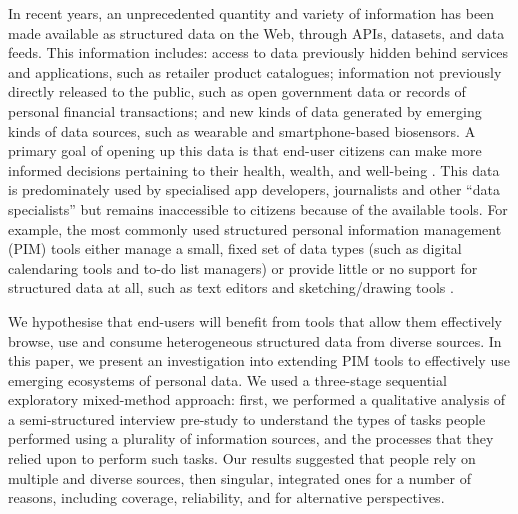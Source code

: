\documentclass{sigchi}
\begin{document}
In recent years, an unprecedented quantity and variety of information has been made available as structured data on the Web, through APIs, datasets, and data feeds.  This information includes: access to data previously hidden behind services and applications, such as retailer product catalogues; information not previously directly released to the public, such as open government data or records of personal financial transactions; and new kinds of data generated by emerging kinds of data sources, such as wearable and smartphone-based biosensors.  A primary goal of opening up this data is that end-user citizens can make more informed decisions pertaining to their health, wealth, and well-being \cite{}.  This data is predominately used by specialised app developers, journalists and other ``data specialists'' but remains inaccessible to citizens because of the available tools.  For example, the most commonly used structured personal information management (PIM) tools either manage a small, fixed set of data types (such as digital calendaring tools and  to-do list managers) or provide little or no support for structured data at all, such as text editors and sketching/drawing tools \cite{}.   

We hypothesise that end-users will benefit from tools that allow them effectively browse, use and consume heterogeneous structured data from diverse sources. In this paper, we present an investigation into extending PIM tools to effectively use emerging ecosystems of personal data.  We used a three-stage sequential exploratory mixed-method approach: first, we performed a qualitative analysis of a semi-structured interview pre-study to understand the types of tasks people performed using a plurality of information sources, and the processes that they relied upon to perform such tasks.  Our results suggested that people rely on multiple and diverse sources, then singular, integrated ones for a number of reasons, including coverage, reliability, and for alternative perspectives.  

\end{document}
